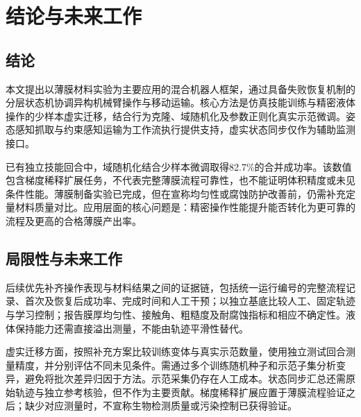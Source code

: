 \section{结论与未来工作}
\label{sec:conclusion}

\subsection{结论}
\label{subsec:conclusion_summary}
本文提出以薄膜材料实验为主要应用的混合机器人框架，通过具备失败恢复机制的分层状态机协调异构机械臂操作与移动运输。核心方法是仿真技能训练与精密液体操作的少样本虚实迁移，结合行为克隆、域随机化及参数正则化真实示范微调。姿态感知抓取与约束感知运输为工作流执行提供支持，虚实状态同步仅作为辅助监测接口。

已有独立技能回合中，域随机化结合少样本微调取得82.7\%的合并成功率。该数值包含梯度稀释扩展任务，不代表完整薄膜流程可靠性，也不能证明体积精度或未见条件性能。薄膜制备实验已完成，但在宣称均匀性或腐蚀防护改善前，仍需补充定量材料质量对比。应用层面的核心问题是：精密操作性能提升能否转化为更可靠的流程及更高的合格薄膜产出率。

\subsection{局限性与未来工作}
\label{subsec:limitations_future}
后续优先补齐操作表现与材料结果之间的证据链，包括统一运行编号的完整流程记录、首次及恢复后成功率、完成时间和人工干预；以独立基底比较人工、固定轨迹与学习控制；报告膜厚均匀性、接触角、粗糙度及耐腐蚀指标和相应不确定性。液体保持能力还需直接溢出测量，不能由轨迹平滑性替代。

虚实迁移方面，按照补充方案比较训练变体与真实示范数量，使用独立测试回合测量精度，并分别评估不同未见条件。需通过多个训练随机种子和示范子集分析变异，避免将批次差异归因于方法。示范采集仍存在人工成本。状态同步汇总还需原始轨迹与独立参考核验，但不作为主要贡献。梯度稀释扩展应置于薄膜流程验证之后；缺少对应测量时，不宣称生物检测质量或污染控制已获得验证。
